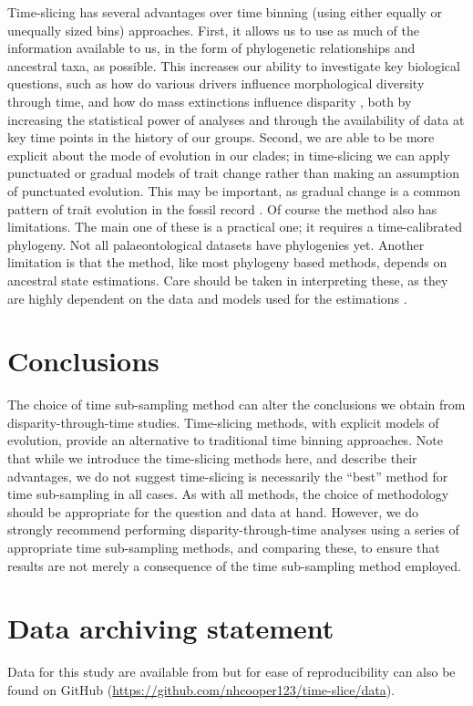 \documentclass[12pt,a4paper]{article}
\begin{document}
Time-slicing has several advantages over time binning (using either equally or unequally sized bins) approaches.
First, it allows us to use as much of the information available to us, in the form of phylogenetic relationships and ancestral taxa, as possible. 
This increases our ability to investigate key biological questions, such as how do various drivers influence morphological diversity through time, and how do mass extinctions influence disparity \citep{Brusatte12092008,Foote29111996,friedmanexplosive2010}, both by increasing the statistical power of analyses and through the availability of data at key time points in the history of our groups.
Second, we are able to be more explicit about the mode of evolution in our clades; in time-slicing we can apply punctuated or gradual models of trait change rather than making an assumption of punctuated evolution.
This may be important, as gradual change is a common pattern of trait evolution in the fossil record \citep{Hunt20112007}.
Of course the method also has limitations.
The main one of these is a practical one; it requires a time-calibrated phylogeny.
Not all palaeontological datasets have phylogenies yet.
Another limitation is that the method, like most phylogeny based methods, depends on ancestral state estimations.
Care should be taken in interpreting these, as they are highly dependent on the data and models used for the estimations \citep{Slateretal2012,doi:10.1080/10635150801910451}.

\section{Conclusions}
The choice of time sub-sampling method can alter the conclusions we obtain from disparity-through-time studies. 
Time-slicing methods, with explicit models of evolution, provide an alternative to traditional time binning approaches.
Note that while we introduce the time-slicing methods here, and describe their advantages, we do not suggest time-slicing is necessarily the ``best'' method for time sub-sampling in all cases. 
As with all methods, the choice of methodology should be appropriate for the question and data at hand.
However, we do strongly recommend performing disparity-through-time analyses using a series of appropriate time sub-sampling methods, and comparing these, to ensure that results are not merely a consequence of the time sub-sampling method employed. 

\section{Data archiving statement}
Data for this study are available from \cite{dryad_n2g80,dryad_6hb7j,dryad_84t75,beckancient2014} but for ease of reproducibility can also be found on GitHub (\url{https://github.com/nhcooper123/time-slice/data}). %
\end{document}
